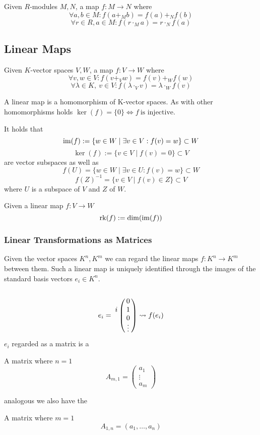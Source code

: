 \begin{definition}
   Given \(R\)-modules \(M, N\), a map \(f: M \to N\) where
   \[\forall a, b \in M: f(a +_M b) = f(a) +_N f(b)\]
   \[\forall r \in R, a \in M: f(r \cdot_M a) = r \cdot_N f(a)\]
\end{definition}

\subsection{Linear Maps}
\begin{definition}
   Given \(K\)-vector spaces \(V, W\), a map \(f: V \to W\) where
   \[\forall v, w \in V: f(v +_V w) = f(v) +_W f(w)\]
   \[\forall \lambda \in K,~v \in V: f(\lambda \cdot_V v) = \lambda \cdot_W f(v)\]
\end{definition}
\begin{remark}
   A linear map is a homomorphism of K-vector spaces.
   As with other homomorphisms holds \(\ker(f) = \{0\} \iff f~\text{is injective}\).
\end{remark}
\begin{remark}
   It holds that
   \[\operatorname{im}(f) := \{w \in W \mid \exists v \in V: f(v) = w\} \subset W\]
   \[\ker(f) := \{v \in V \mid f(v) = 0\} \subset V\]
   are vector subspaces as well as
   \[f(U) = \{w \in W \mid \exists v \in U: f(v) = w\} \subset W\]
   \[f(Z)^{-1} = \{v \in V \mid f(v) \in Z\} \subset V\]
   where \(U\) is a subspace of \(V\) and \(Z\) of \(W\).
\end{remark}

\begin{definition}\label{def:linmaprank}
   Given a linear map \(f: V \to W\)
   \[\operatorname{rk}(f) := \dim(\operatorname{im}(f))\]
\end{definition}

\subsubsection{Linear Transformations as Matrices}
Given the vector spaces \(K^n, K^m\) we can regard the linear maps \(f: K^n \to K^m\) between them.
Such a linear map is uniquely identified through the images of the standard basis vectors \(e_i \in K^n\).
\[e_i = \bordermatrix{
      ~ &   \cr
        & 0 \cr
      i & 1 \cr
        & 0 \cr
        & \vdots} \rightsquigarrow f(e_i)\]
\(e_i\) regarded as a matrix is a
\begin{definition}
   A matrix where \(n = 1\)
   \[A_{m,1} = \begin{pmatrix} a_1 \\ \vdots \\ a_m \end{pmatrix}\]
\end{definition}
analogous we also have the
\begin{definition}
   A matrix where \(m = 1\)
   \[A_{1,n} = (a_1, \ldots, a_n)\]
\end{definition}

